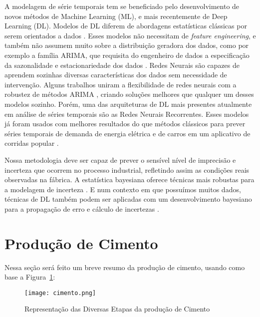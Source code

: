 A modelagem de série temporais tem se beneficiado pelo desenvolvimento de novos
métodos de Machine Learning (ML), e mais recentemente de Deep Learning (DL).
Modelos de DL diferem de abordagens estatísticas clássicas por serem orientados
a dados \citep{dlbook}.
Esses modelos não necessitam de \textit{feature engineering}, e também não
assumem muito sobre a distribuição geradora dos dados, como por exemplo a
família ARIMA, que requisita do engenheiro de dados a especificação da
sazonalidade e estacionariedade dos dados \citep{arima}.
Redes Neurais são capazes de aprendem sozinhas diversas características dos dados sem necessidade de intervenção. 
Alguns trabalhos uniram a flexibilidade de redes neurais com a robustez de
métodos ARIMA \citep{DIAZROBLES20088331,KHASHEI2010479},
criando soluções melhores que qualquer um desses modelos sozinho. Porém, uma das
arquiteturas de DL mais presentes atualmente em análise de séries temporais
são as Redes Neurais Recorrentes. Esses modelos já foram usados com
melhores resultados do que métodos clássicos para prever séries temporais de
demanda de energia elétrica e de carros em um aplicativo de corridas popular
\cite{energylstm,ubertime}.


Nossa metodologia deve ser capaz de prever o sensível nível de imprecisão e
incerteza que ocorrem no processo industrial,
refletindo assim as condições reais observadas na fábrica. A estatística bayesiana oferece técnicas
mais robustas para a modelagem de incerteza \cite{bayesml}. E num contexto em
que possuímos muitos dados, técnicas de DL também podem ser aplicadas com um desenvolvimento bayesiano para a propagação de erro e cálculo de incertezas \cite{ubertime,Gal2016Uncertainty}. 



\section{Produção de Cimento}
\label{sec:producao}

Nessa seção será feito um breve resumo da produção de cimento, usando como base a Figura~\ref{fig:cimento}:  

\begin{figure}[H]
\centering
\texttt{[image: cimento.png]}
\caption{Representação das Diversas Etapas da produção de Cimento \citep{cementroadmap}}
\label{fig:cimento}
\end{figure}


